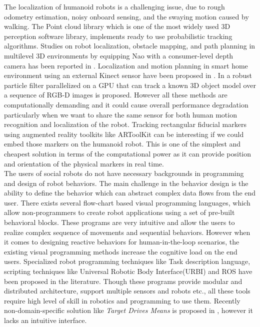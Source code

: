 \documentclass{llncs}
\begin{document}
	The localization of humanoid robots is a challenging issue, due to rough odometry estimation, noisy onboard sensing, and the swaying motion caused by walking\cite{Cervera2012}. The Point cloud library\cite{RusuPCL11} which is one of the most widely used 3D perception software library, implements ready to use probabilistic tracking algorithms\cite{RUeda2012}. Studies on robot localization, obstacle mapping, and path planning in multilevel 3D environments by equipping Nao with a consumer-level depth camera has been reported in \cite{Maier2012}. Localization and motion planning in smart home environment using an external Kinect sensor have been proposed in \cite{Cervera2012}. In \cite{choi13_rgb_d_objec_track} a robust particle filter parallelized on a GPU that can track a known 3D object model over a sequence of RGB-D images is proposed. However all these methods are computationally demanding and it could cause overall performance degradation particularly when we want to share the same sensor for both human motion recognition and localization of the robot.  Tracking rectangular fiducial markers using  augmented reality toolkits like ARToolKit\cite{Kato1999} can be interesting if we could embed those markers on the humanoid robot. This is one of the simplest and cheapest solution in terms of the computational power as it can provide position and orientation of the physical markers in real time.\\
	
	The users of social robots do not have necessary backgrounds in programming and design of robot behaviors. The main challenge in the behavior design is the ability to define the behavior which can abstract complex data flows from the end user. There exists several flow-chart based visual programming languages\cite{MSRS4},\cite{Choregraphe} which allow non-programmers to create robot applications using a set of pre-built behavioral blocks. These programs are very intuitive and allow the users to realize complex sequence of movements and sequential behaviors. However when it comes to designing reactive behaviors for human-in-the-loop scenarios, the existing visual programming methods increase the cognitive load on the end users. Specialized robot programming techniques like Task description language\cite{Simmons724883}, scripting techniques like Universal Robotic Body Interface(URBI)\cite{Baillie4814281} and ROS\cite{quigley2009ros} have been proposed in the literature. Though these programs provide modular and distributed architecture, support multiple sensors and robots etc., all these tools require high level of skill in robotics and programming to use them. Recently non-domain-specific solution like \emph{Target Drives Means} is proposed in \cite{BerenzTDM2014}, however it lacks an intuitive interface.\\
	
\end{document}
